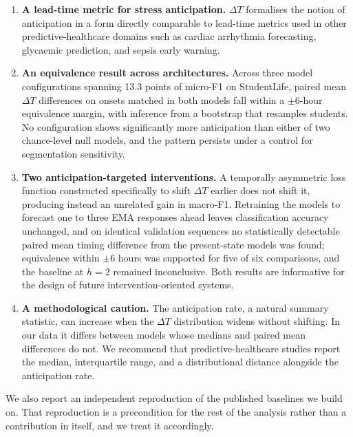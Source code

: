 \documentclass[preprint,12pt,authoryear]{elsarticle}
\newcommand{\dt}{$\Delta T$}
\begin{document}
\begin{enumerate}

\item \textbf{A lead-time metric for stress anticipation.} \dt{}
formalises the notion of anticipation in a form directly comparable to
lead-time metrics used in other predictive-healthcare domains such as
cardiac arrhythmia forecasting, glycaemic prediction, and sepsis
early warning.

\item \textbf{An equivalence result across architectures.} Across
three model configurations spanning 13.3 points of micro-F1 on
StudentLife, paired mean \dt{} differences on onsets matched in both
models fall within a $\pm 6$-hour equivalence margin, with inference
from a bootstrap that resamples students. No configuration shows
significantly more anticipation than either of two chance-level null
models, and the pattern persists under a control for segmentation
sensitivity.

\item \textbf{Two anticipation-targeted interventions.} A temporally
asymmetric loss function constructed specifically to shift \dt{}
earlier does not shift it, producing instead an unrelated gain in
macro-F1. Retraining the models to forecast one to three EMA responses
ahead leaves classification accuracy unchanged, and on identical
validation sequences no statistically detectable paired mean timing
difference from the present-state models was found; equivalence within
$\pm 6$ hours was supported for five of six comparisons, and the
baseline at $h = 2$ remained inconclusive. Both results are informative
for the design of future intervention-oriented systems.

\item \textbf{A methodological caution.} The anticipation rate, a
natural summary statistic, can increase when the \dt{} distribution
widens without shifting. In our data it differs between models whose
medians and paired mean differences do not. We recommend that predictive-healthcare studies report the
median, interquartile range, and a distributional distance alongside
the anticipation rate.

\end{enumerate}

We also report an independent reproduction of the published baselines
we build on. That reproduction is a precondition for the rest of the
analysis rather than a contribution in itself, and we treat it
accordingly.
\end{document}
